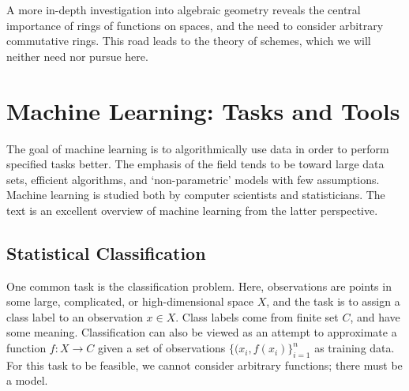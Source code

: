 \documentclass[11pt,titlepage]{article}
\numberwithin{equation}{section}
\begin{document}
    A more in-depth investigation into algebraic geometry reveals the central
    importance of rings of functions on spaces, and the need to consider
    arbitrary commutative rings.  This road leads to the theory of schemes,
    which we will neither need nor pursue here.

\section{Machine Learning: Tasks and Tools}
    \label{sec:ML}

    The goal of machine learning is to algorithmically use data in order to
    perform specified tasks better.  The emphasis of the field tends to be
    toward large data sets, efficient algorithms, and `non-parametric' models
    with few assumptions.  Machine learning is studied both by computer
    scientists and statisticians.  The text \cite{EOSL} is an excellent overview
    of machine learning from the latter perspective.

\subsection{Statistical Classification}

    One common task is the classification problem.  Here, observations are
    points in some large, complicated, or high-dimensional space $X$, and the
    task is to assign a class label to an observation $x \in X$.  Class labels
    come from finite set $C$, and have some meaning.  Classification can also be
    viewed as an attempt to approximate a function $f : X \to C$ given a set of
    observations $\{(x_i, f(x_i)\}_{i=1}^n$ as training data.  For this task to
    be feasible, we cannot consider arbitrary functions; there must be a model.
\end{document}
